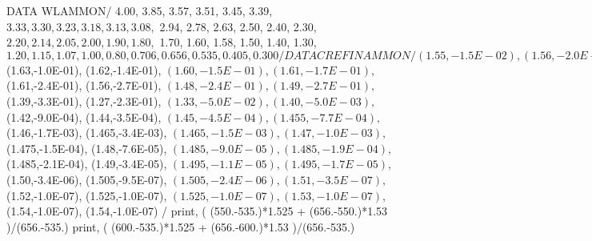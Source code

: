       DATA WLAMMON/  4.00, 3.85, 3.57, 3.51, 3.45, 3.39,
     $               3.33, 3.30, 3.23, 3.18, 3.13, 3.08,
     $               2.94, 2.78, 2.63, 2.50, 2.40, 2.30,
     $               2.20, 2.14, 2.05, 2.00, 1.90, 1.80,
     $               1.70, 1.60, 1.58, 1.50, 1.40, 1.30,
     $               1.20, 1.15, 1.07,

 1.00, 0.80, 0.706, 0.656,0.535,0.405,0.300              /

      DATA CREFINAMMON/ (1.55,-1.5E-02), (1.56,-2.0E-02),
     $                  (1.63,-1.0E-01), (1.62,-1.4E-01),
     $                  (1.60,-1.5E-01), (1.61,-1.7E-01),
     $                  (1.61,-2.4E-01), (1.56,-2.7E-01),
     $                  (1.48,-2.4E-01), (1.49,-2.7E-01),
     $                  (1.39,-3.3E-01), (1.27,-2.3E-01),
     $                  (1.33,-5.0E-02), (1.40,-5.0E-03),
     $                  (1.42,-9.0E-04), (1.44,-3.5E-04),
     $                  (1.45,-4.5E-04), (1.455,-7.7E-04),
     $                  (1.46,-1.7E-03), (1.465,-3.4E-03),
     $                  (1.465,-1.5E-03), (1.47,-1.0E-03),
     $                  (1.475,-1.5E-04), (1.48,-7.6E-05),
     $                  (1.485,-9.0E-05), (1.485,-1.9E-04),
     $                  (1.485,-2.1E-04), (1.49,-3.4E-05),
     $                  (1.495,-1.1E-05), (1.495,-1.7E-05),
     $                  (1.50,-3.4E-06), (1.505,-9.5E-07),
     $                  (1.505,-2.4E-06), 

(1.51,-3.5E-07),
     $                  (1.52,-1.0E-07), (1.525,-1.0E-07),
     $                  (1.525,-1.0E-07), (1.53,-1.0E-07),
     $                  (1.54,-1.0E-07), (1.54,-1.0E-07)  /
print, ( (550.-535.)*1.525 + (656.-550.)*1.53 )/(656.-535.)
print, ( (600.-535.)*1.525 + (656.-600.)*1.53 )/(656.-535.)


